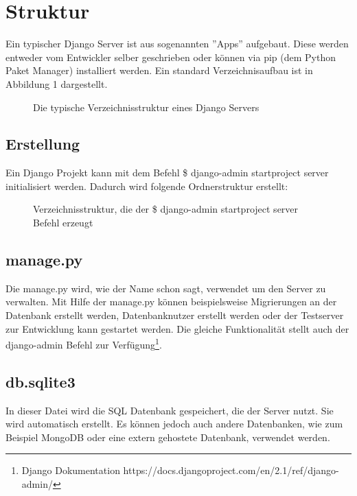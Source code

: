 \documentclass{article}
\begin{document}
\section{Struktur}
Ein typischer Django Server ist aus sogenannten ''Apps'' aufgebaut. Diese werden entweder vom Entwickler selber geschrieben oder können via pip (dem Python Paket Manager) installiert werden. Ein standard Verzeichnisaufbau ist in Abbildung 1 dargestellt.
\newpage
\begin{figure}[H]
	\caption{Die typische Verzeichnisstruktur eines Django Servers}
\end{figure}

\subsection{Erstellung}
Ein Django Projekt kann mit dem Befehl \$ django-admin startproject server initialisiert werden. Dadurch wird folgende Ordnerstruktur erstellt:
\begin{figure}[H]
\caption{Verzeichnisstruktur, die der \$ django-admin startproject server Befehl erzeugt}
\end{figure}
\subsection{manage.py}
Die manage.py wird, wie der Name schon sagt, verwendet um den Server zu verwalten. Mit Hilfe der manage.py können beispielsweise Migrierungen an der Datenbank erstellt werden, Datenbanknutzer erstellt werden oder der Testserver zur Entwicklung kann gestartet werden. Die gleiche Funktionalität stellt auch der django-admin Befehl zur Verfügung\footnote{Django Dokumentation https://docs.djangoproject.com/en/2.1/ref/django-admin/}.

\subsection{db.sqlite3}
In dieser Datei wird die SQL Datenbank gespeichert, die der Server nutzt. Sie wird automatisch erstellt. Es können jedoch auch andere Datenbanken, wie zum Beispiel MongoDB oder eine extern gehostete Datenbank, verwendet werden.
\end{document}
